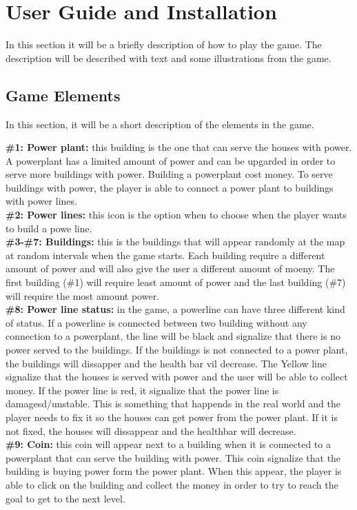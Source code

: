 \chapter{User Guide and Installation}

In this section it will be a briefly description of how to play the game.
The description will be described with text and some illustrations from the
game. 

\clearpage

\section{Game Elements}
	In this section, it will be a short description of the elements in the game.

	{\bf \#1: Power plant:} this building is the one that can serve the houses
	with power. A powerplant has a limited amount of power and can be upgarded
	in order to serve more buildings with power. Building a powerplant cost money.
	To serve buildings with power, the player is able to connect a power plant to
	buildings with power lines. \\
	{\bf \#2: Power lines: } this icon is the option when to choose when the player
	wants to build a powe line. \\
	{\bf \#3-\#7: Buildings: } this is the buildings that will appear randomly at the
	map at random intervals when the game starts. Each building require a different 
	amount of power and will also give the user a different amount of moeny. 
	The first building (\#1) will require least amount of power and the last building
	(\#7) will require the most amount power. \\
	{\bf \#8: Power line status:} in the game, a powerline can have three different kind
	of status. If a powerline is connected between two building without any connection
	to a powerplant, the line will be black and signalize that there is no power served
	to the buildings. If the buildings is not connected to a power plant, the buildings
	will dissapper and the health bar vil decrease. The Yellow line signalize that the
	houses is served with power and the user will be able to collect money. If the 
	power line is red, it signalize that the power line is damagesd/unstable. This is
	something that happends in the real world and the player needs to fix it so the
	houses can get power from the power plant. If it is not fixed, the houses will 
	dissappear and the healthbar will decrease. \\ 
	{\bf \#9: Coin: } this coin will appear next to a building when it is connected to
	a powerplant that can serve the building with power. This coin signalize that
	the building is buying power form the power plant. When this appear, the player
	is able to click on the building and collect the money in order to try to 
	reach the goal to get to the next level. 

